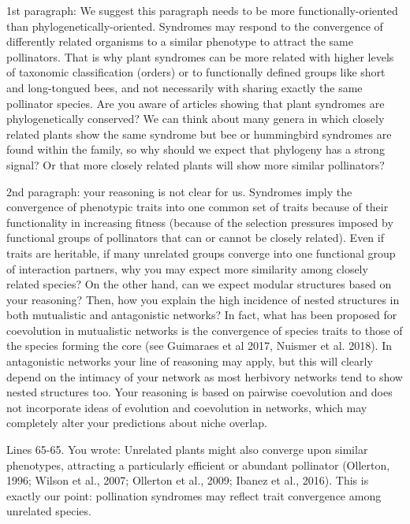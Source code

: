 \documentclass[12pt]{letter}
\newenvironment{refquote}{\bigskip \begin{it}}{\end{it}\smallskip}
\begin{document}
		\begin{refquote}
			1st paragraph: We suggest this paragraph needs to be more functionally-oriented than phylogenetically-oriented. Syndromes may respond to the convergence of differently related organisms to a similar phenotype to attract the same pollinators. That is why plant syndromes can be more related with higher levels of taxonomic classification (orders) or to functionally defined groups like short and long-tongued bees, and not necessarily with sharing exactly the same pollinator species. Are you aware of articles showing that plant syndromes are phylogenetically conserved? We can think about many genera in which closely related plants show the same syndrome but bee or hummingbird syndromes are found within the family, so why should we expect that phylogeny has a strong signal? Or that more closely related plants will show more similar pollinators?
		\end{refquote}

		\begin{refquote}
			2nd paragraph: your reasoning is not clear for us. Syndromes imply the convergence of phenotypic traits into one common set of traits because of their functionality in increasing fitness (because of the selection pressures imposed by functional groups of pollinators that can or cannot be closely related). Even if traits are heritable, if many unrelated groups converge into one functional group of interaction partners, why you may expect more similarity among closely related species? On the other hand, can we expect modular structures based on your reasoning? Then, how you explain the high incidence of nested structures in both mutualistic and antagonistic networks? In fact, what has been proposed for coevolution in mutualistic networks is the convergence of species traits to those of the species forming the core (see Guimaraes et al 2017, Nuismer et al. 2018). In antagonistic networks your line of reasoning may apply, but this will clearly depend on the intimacy of your network as most herbivory networks tend to show nested structures too. Your reasoning is based on pairwise coevolution and does not incorporate ideas of evolution and coevolution in networks, which may completely alter your predictions about niche overlap.
		\end{refquote}

		\begin{refquote}
			Lines 65-65. You wrote: Unrelated plants might also converge upon similar phenotypes, attracting a particularly efficient or abundant pollinator (Ollerton, 1996; Wilson et al., 2007; Ollerton et al., 2009; Ibanez et al., 2016). This is exactly our point: pollination syndromes may reflect trait convergence among unrelated species.
		\end{refquote}
\end{document}
